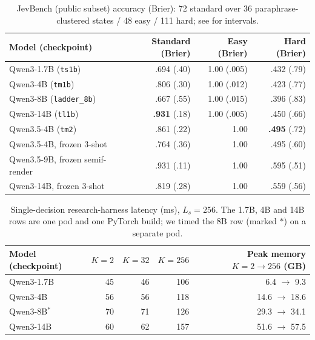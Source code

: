 \begin{table}[h]
  \centering
  \caption{JevBench (public subset) accuracy (Brier): 72 standard over 36
  paraphrase-clustered states / 48 easy / 111 hard; see  for intervals.}
  \label{tab:app-jevbench}
  \small
  \begin{tabular}{lrrr}
    \toprule
    Model (checkpoint) & Standard (Brier) & Easy (Brier) & Hard (Brier) \\
    \midrule
    Qwen3-1.7B (\texttt{ts1b}) & .694 (.40) & 1.00 (.005) & .432 (.79) \\
    Qwen3-4B (\texttt{tm1b}) & .806 (.30) & 1.00 (.012) & .423 (.77) \\
    Qwen3-8B (\texttt{ladder\_8b}) & .667 (.55) & 1.00 (.015) & .396 (.83) \\
    Qwen3-14B (\texttt{tl1b}) & \textbf{.931} (.18) & 1.00 (.005) & .450 (.66) \\
    Qwen3.5-4B (\texttt{tm2}) & .861 (.22) & 1.00 & \textbf{.495} (.72) \\
    Qwen3.5-4B, frozen 3-shot & .764 (.36) & 1.00 & .495 (.60) \\
    Qwen3.5-9B, frozen semif-render & .931 (.11) & 1.00 & .595 (.51) \\
    Qwen3-14B, frozen 3-shot & .819 (.28) & 1.00 & .559 (.56) \\
    \bottomrule
  \end{tabular}
\end{table}

\begin{table}[h]
  \centering
  \caption{Single-decision research-harness latency (ms), $L_s{=}256$. The 1.7B, 4B and 14B rows are one
  pod and one PyTorch build; we timed the 8B row (marked $\ast$) on a separate pod.}
  \label{tab:app-latency}
  \small
  \begin{tabular}{lrrrr}
    \toprule
    Model (checkpoint) & $K{=}2$ & $K{=}32$ & $K{=}256$ & Peak memory $K{=}2{\to}256$ (GB) \\
    \midrule
    Qwen3-1.7B & 45 & 46 & 106 & 6.4 $\to$ 9.3 \\
    Qwen3-4B & 56 & 56 & 118 & 14.6 $\to$ 18.6 \\
    Qwen3-8B$^\ast$ & 70 & 71 & 126 & 29.3 $\to$ 34.1 \\
    Qwen3-14B & 60 & 62 & 157 & 51.6 $\to$ 57.5 \\
    \bottomrule
  \end{tabular}
\end{table}
